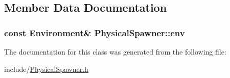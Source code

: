 \subsection{Member Data Documentation}
\hypertarget{class_physical_spawner_a57664efe7795d64b6d009b30b74d2c91}{
\subsubsection[{env}]{\setlength{\rightskip}{0pt plus 5cm}const {\bf Environment}\& Physical\-Spawner\-::env\hspace{0.3cm}{\ttfamily [protected]}}}\label{class_physical_spawner_a57664efe7795d64b6d009b30b74d2c91}


The documentation for this class was generated from the following file\-:\begin{DoxyCompactItemize}
\item 
include/\hyperlink{_physical_spawner_8h}{Physical\-Spawner.\-h}\end{DoxyCompactItemize}
